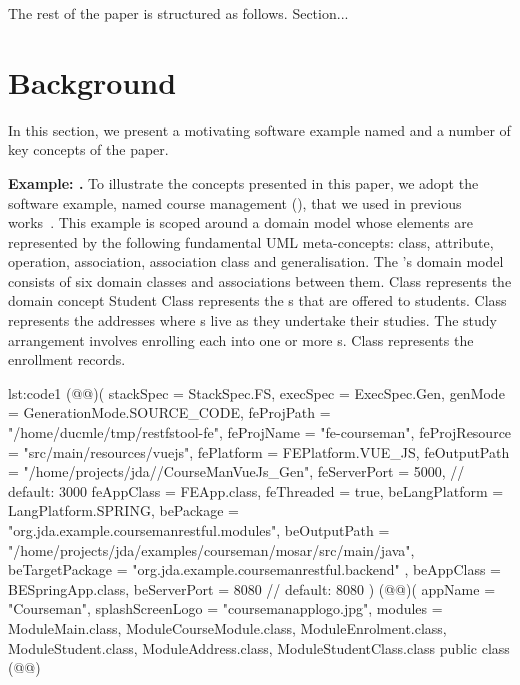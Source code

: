 \documentclass[runningheads]{llncs}
\begin{document}
The rest of the paper is structured as follows. Section...
%
\section{Background} \label{sect:background}
In this section, we present a motivating software example named \courseman and a number of key concepts of the paper.

\textbf{Example: \courseman.} %
To illustrate the concepts presented in this paper, we adopt the software example, named course management (\courseman), that we used in previous works~\cite{le_jdomainapp_2019,le_generative_2020}. This example is scoped around a domain model whose elements are represented by the following fundamental UML \cite{omg_unified_2015} meta-concepts: class, attribute, operation, association, association class and generalisation.
%
The \courseman's domain model consists of six domain classes and associations between them.
Class  represents the domain concept Student
Class  represents the s
that are offered to students.
Class  represents the addresses where s live as they undertake their studies. The study arrangement involves enrolling each  into one or more s. Class  represents the enrollment records.


\begin{lstcode}{}{lst:code1}
(@@)(
  stackSpec = StackSpec.FS,
  execSpec = ExecSpec.Gen,
  genMode = GenerationMode.SOURCE_CODE,
  feProjPath = "/home/ducmle/tmp/restfstool-fe",
  feProjName = "fe-courseman",
  feProjResource = "src/main/resources/vuejs",
  fePlatform = FEPlatform.VUE_JS,
  feOutputPath = "/home/projects/jda//CourseManVueJs_Gen",
  feServerPort = 5000,  // default: 3000
  feAppClass = FEApp.class,
  feThreaded = true,
  beLangPlatform = LangPlatform.SPRING,
  bePackage = "org.jda.example.coursemanrestful.modules",
  beOutputPath = "/home/projects/jda/examples/courseman/mosar/src/main/java",
  beTargetPackage = "org.jda.example.coursemanrestful.backend"
  , beAppClass = BESpringApp.class,
  beServerPort = 8080  // default: 8080
)
(@@)(
  appName = "Courseman",
  splashScreenLogo = "coursemanapplogo.jpg",
  modules = {
    ModuleMain.class,
    ModuleCourseModule.class,
    ModuleEnrolment.class,
    ModuleStudent.class,
    ModuleAddress.class,
    ModuleStudentClass.class
  }
public class (@@) { }
\end{lstcode}
\end{document}
